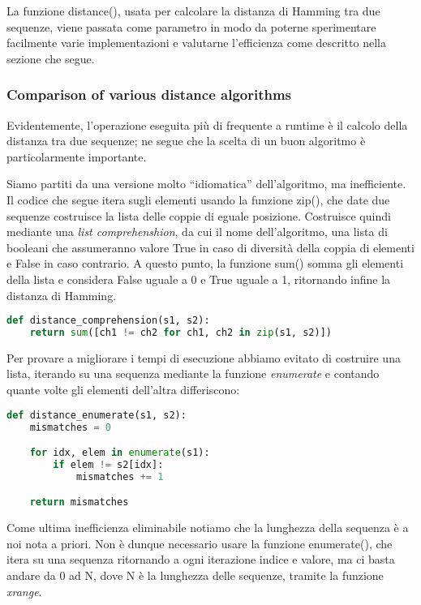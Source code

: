 \documentclass[11pt]{article}
\begin{document}
La funzione distance(), usata per calcolare la distanza di Hamming tra due
sequenze, viene passata come parametro in modo da poterne sperimentare
facilmente varie implementazioni e valutarne l'efficienza come descritto nella
sezione che segue.

\subsubsection{Comparison of various distance algorithms}
Evidentemente, l'operazione eseguita più di frequente a runtime è il calcolo
della distanza tra due sequenze; ne segue che la scelta di un buon algoritmo è
particolarmente importante.

Siamo partiti da una versione molto ``idiomatica'' dell'algoritmo, ma
inefficiente. Il codice che segue itera sugli elementi usando la funzione
zip(), che date due sequenze costruisce la lista delle coppie di eguale
posizione. Costruisce quindi mediante una \emph{list comprehenshion}, da cui il
nome dell'algoritmo, una lista di booleani che assumeranno valore True in caso
di diversità della coppia di elementi e False in caso contrario. A questo
punto, la funzione sum() somma gli elementi della lista e considera False
uguale a 0 e True uguale a 1, ritornando infine la distanza di Hamming.

\begin{lstlisting}[language=Python]
def distance_comprehension(s1, s2):
    return sum([ch1 != ch2 for ch1, ch2 in zip(s1, s2)])
\end{lstlisting}

Per provare a migliorare i tempi di esecuzione abbiamo evitato di costruire una
lista, iterando su una sequenza mediante la funzione \emph{enumerate} e
contando quante volte gli elementi dell'altra differiscono:

\begin{lstlisting}[language=Python]
def distance_enumerate(s1, s2):
    mismatches = 0

    for idx, elem in enumerate(s1):
        if elem != s2[idx]:
            mismatches += 1

    return mismatches
\end{lstlisting}

Come ultima inefficienza eliminabile notiamo che la lunghezza della sequenza è
a noi nota a priori. Non è dunque necessario usare la funzione enumerate(), che
itera su una sequenza ritornando a ogni iterazione indice e valore, ma ci basta
andare da 0 ad N, dove N è la lunghezza delle sequenze, tramite la funzione
\emph{xrange}.
\end{document}
